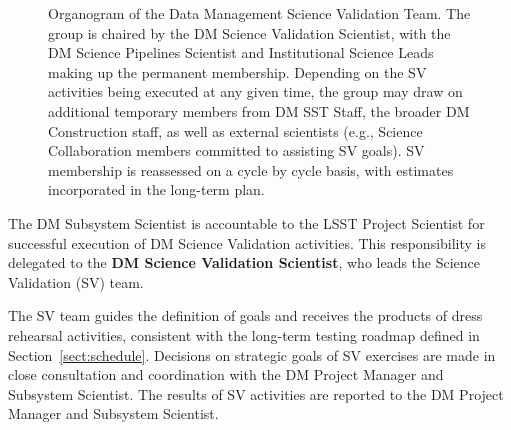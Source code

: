 \begin{figure}
\centering
{}
\caption{Organogram of the Data Management Science Validation Team.
The group is chaired by the DM Science Validation Scientist,
with the DM Science Pipelines Scientist and Institutional Science Leads making up
the permanent membership. Depending on the SV activities being executed at any
given time, the group may draw on additional temporary members from DM SST Staff,
the broader DM Construction staff, as well as external scientists (e.g.,
Science Collaboration members committed to assisting SV goals). SV membership
is reassessed on a cycle by cycle basis, with estimates incorporated in the
long-term plan.
\label{fig:DMsvg}}
\end{figure}

The DM Subsystem Scientist is accountable to the LSST Project Scientist for
successful execution of DM Science Validation activities.  This
responsibility is delegated to the {\bf DM Science Validation Scientist},
who leads the Science Validation (SV) team.

The SV team guides the definition of goals and receives the products of
dress rehearsal activities, consistent with the long-term testing roadmap
defined in Section~\ref{sect:schedule}.  Decisions on strategic goals of SV exercises are made
in close consultation and coordination with the DM Project Manager and
Subsystem Scientist.  The results of SV activities are reported to the DM
Project Manager and Subsystem Scientist.

